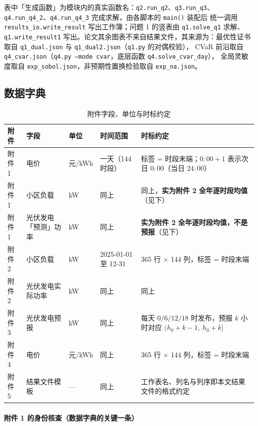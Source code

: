 表中「生成函数」为模块内的真实函数名：\texttt{q2.run\_q2}、\texttt{q3.run\_q3}、
\texttt{q4.run\_q4\_2}、\texttt{q4.run\_q4\_3} 完成求解，由各脚本的 \texttt{main()} 装配后
统一调用 \texttt{results\_io.write\_result} 写出工作簿；问题 1 的竖表由 \texttt{q1.solve\_q1} 求解、
\texttt{q1.write\_result1} 写出。论文其余图表不来自结果文件，其来源为：最优性证书取自
\texttt{q1\_dual.json} 与 \texttt{q1\_dual2.json}（\texttt{q1.py} 的对偶校验），
CVaR 前沿取自 \texttt{q4\_cvar.json}（\texttt{q4.py --mode cvar}，底层函数 \texttt{q4.solve\_cvar\_day}），
全局灵敏度取自 \texttt{exp\_sobol.json}，非预期性置换检验取自 \texttt{exp\_na.json}。

\subsection{数据字典}

\begin{table}[htbp]
  \centering
  \caption{附件字段、单位与时标约定}
  \label{tab:datadict}
  \footnotesize
  \begin{tabularx}{\linewidth}{C{1.4cm} L{3.0cm} C{1.6cm} C{2.4cm} Y}
    \toprule
    附件 & 字段 & 单位 & 时间范围 & 时标约定 \\
    \midrule
    附件 1 & 电价 & 元/kWh & 一天（144 时段） & 标签 = 时段末端；$0{:}00{+}1$ 表示次日 $0{:}00$（当日 $24{:}00$） \\
    附件 1 & 小区负载 & kW & 同上 & 同上，\textbf{实为附件 2 全年逐时段均值}（见下） \\
    附件 1 & 光伏发电「预测」功率 & kW & 同上 & \textbf{实为附件 2 全年逐时段均值，不是预报}（见下） \\
    附件 2 & 小区负载 & kW & 2025-01-01 至 12-31 & 365 行 $\times$ 144 列，标签 = 时段末端 \\
    附件 2 & 光伏发电实际功率 & kW & 同上 & 同上 \\
    附件 3 & 光伏发电预报 & kW & 同上 & 每天 $0/6/12/18$ 时发布，预报 $k$ 小时对应 $(h_0+k-1,\ h_0+k]$ \\
    附件 4 & 电价 & 元/kWh & 同上 & 365 行 $\times$ 144 列，标签 = 时段末端 \\
    附件 5 & 结果文件模板 & --- & 同上 & 工作表名、列名与列序即本文结果文件的格式约定 \\
    \bottomrule
  \end{tabularx}
\end{table}

\paragraph{附件 1 的身份核查（数据字典的关键一条）}

